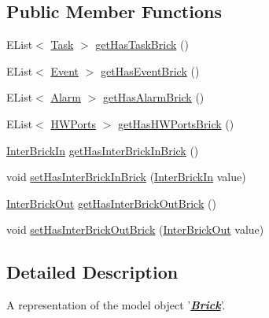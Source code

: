 \subsection*{Public Member Functions}
\begin{DoxyCompactItemize}
\item 
E\-List$<$ \hyperlink{interfaceshootingmachineemfmodel_1_1_task}{Task} $>$ \hyperlink{interfaceshootingmachineemfmodel_1_1_brick_a063385dcb4a25c88d2fa386b9bda8c32}{get\-Has\-Task\-Brick} ()
\item 
E\-List$<$ \hyperlink{interfaceshootingmachineemfmodel_1_1_event}{Event} $>$ \hyperlink{interfaceshootingmachineemfmodel_1_1_brick_a2ed9cfe1b2efe1fff74f892e4adbe45f}{get\-Has\-Event\-Brick} ()
\item 
E\-List$<$ \hyperlink{interfaceshootingmachineemfmodel_1_1_alarm}{Alarm} $>$ \hyperlink{interfaceshootingmachineemfmodel_1_1_brick_a2515e419b826f2f375f18c1add95c510}{get\-Has\-Alarm\-Brick} ()
\item 
E\-List$<$ \hyperlink{interfaceshootingmachineemfmodel_1_1_h_w_ports}{H\-W\-Ports} $>$ \hyperlink{interfaceshootingmachineemfmodel_1_1_brick_afffd47f65b71a9ddfbf89105f27aadde}{get\-Has\-H\-W\-Ports\-Brick} ()
\item 
\hyperlink{interfaceshootingmachineemfmodel_1_1_inter_brick_in}{Inter\-Brick\-In} \hyperlink{interfaceshootingmachineemfmodel_1_1_brick_a439f80db99f165fd9cfe00b554498dc1}{get\-Has\-Inter\-Brick\-In\-Brick} ()
\item 
void \hyperlink{interfaceshootingmachineemfmodel_1_1_brick_a580b93a84eda15d7dd1e0d71006eb993}{set\-Has\-Inter\-Brick\-In\-Brick} (\hyperlink{interfaceshootingmachineemfmodel_1_1_inter_brick_in}{Inter\-Brick\-In} value)
\item 
\hyperlink{interfaceshootingmachineemfmodel_1_1_inter_brick_out}{Inter\-Brick\-Out} \hyperlink{interfaceshootingmachineemfmodel_1_1_brick_a5af63cdf69e6685ff67377e4ab4d8745}{get\-Has\-Inter\-Brick\-Out\-Brick} ()
\item 
void \hyperlink{interfaceshootingmachineemfmodel_1_1_brick_a68a3513b31e6b8cdf6bab8fcbfe5cf4e}{set\-Has\-Inter\-Brick\-Out\-Brick} (\hyperlink{interfaceshootingmachineemfmodel_1_1_inter_brick_out}{Inter\-Brick\-Out} value)
\end{DoxyCompactItemize}


\subsection{Detailed Description}
A representation of the model object '{\itshape {\bfseries \hyperlink{interfaceshootingmachineemfmodel_1_1_brick}{Brick}}}'.

